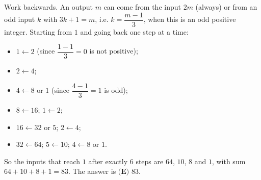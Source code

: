 Work backwards. An output $m$ can come from the input $2m$ (always) or from an odd input $k$ with $3k+1=m$, i.e. $k=\dfrac{m-1}3$, when this is an odd positive integer. Starting from $1$ and going back one step at a time:
\begin{itemize}
\item $1\leftarrow2$ (since $\dfrac{1-1}{3}=0$ is not positive);
\item $2\leftarrow4$;
\item $4\leftarrow8$ or $1$ (since $\dfrac{4-1}{3}=1$ is odd);
\item $8\leftarrow16$; $1\leftarrow2$;
\item $16\leftarrow32$ or $5$; $2\leftarrow4$;
\item $32\leftarrow64$; $5\leftarrow10$; $4\leftarrow8$ or $1$.
\end{itemize}
So the inputs that reach $1$ after exactly $6$ steps are $64$, $10$, $8$ and $1$, with sum $64+10+8+1=83$. The answer is $\boxed{\textbf{(E) }83}$.
